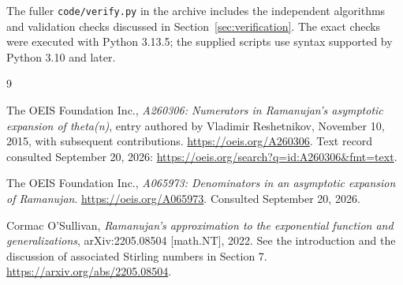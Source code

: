 \documentclass[11pt,letterpaper]{article}
\numberwithin{equation}{section}
\theoremstyle{remark}
\begin{document}
The fuller \texttt{code/verify.py} in the archive includes the independent
algorithms and validation checks discussed in
Section~\ref{sec:verification}. The exact checks were executed with
Python 3.13.5; the supplied scripts use syntax supported by Python 3.10
and later.

\begin{thebibliography}{9}

The OEIS Foundation Inc.,
\emph{A260306: Numerators in Ramanujan's asymptotic expansion of theta(n)},
entry authored by Vladimir Reshetnikov, November 10, 2015, with subsequent
contributions.
\url{https://oeis.org/A260306}.
Text record consulted September 20, 2026:
\url{https://oeis.org/search?q=id:A260306&fmt=text}.

The OEIS Foundation Inc.,
\emph{A065973: Denominators in an asymptotic expansion of Ramanujan}.
\url{https://oeis.org/A065973}.
Consulted September 20, 2026.

Cormac O'Sullivan,
\emph{Ramanujan's approximation to the exponential function and
generalizations}, arXiv:2205.08504 [math.NT], 2022.
See the introduction and the discussion of associated Stirling numbers
in Section 7.
\url{https://arxiv.org/abs/2205.08504}.

\end{thebibliography}
\end{document}
